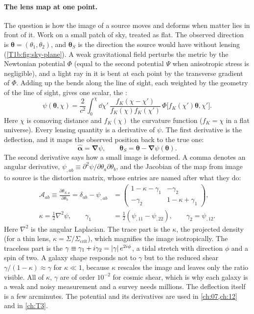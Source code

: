 \paragraph{The lens map at one point.}
The question is how the image of a source moves and deforms when matter lies in front of it. Work on a small patch of sky, treated as flat. The observed direction is $\bm\theta=(\theta_1,\theta_2)$, and $\bm\theta_S$ is the direction the source would have without lensing (\cref{T1b:fig:sky-plane}). A weak gravitational field perturbs the metric by the Newtonian potential $\Phi$ (equal to the second potential $\Psi$ when anisotropic stress is negligible), and a light ray in it is bent at each point by the transverse gradient of $\Phi$. Adding up the bends along the line of sight, each weighted by the geometry of the line of sight, gives one scalar, the :
\begin{equation*}
\psi(\bm\theta,\chi)=\frac{2}{c^2}\int_0^\chi\!\dd\chi'\,\frac{f_K(\chi-\chi')}{f_K(\chi)f_K(\chi')}\,\Phi\bigl[f_K(\chi')\bm\theta,\chi'\bigr].
\end{equation*}
Here $\chi$ is comoving distance and $f_K(\chi)$ the curvature function ($f_K=\chi$ in a flat universe). Every lensing quantity is a derivative of $\psi$. The first derivative is the deflection, and it maps the observed position back to the true one:
\begin{equation*}
\hat{\bm\alpha}=\bm\nabla\psi,\qquad\bm\theta_S=\bm\theta-\bm\nabla\psi(\bm\theta).
\end{equation*}
The second derivative says how a small image is deformed. A comma denotes an angular derivative, $\psi_{,ab}\equiv\partial^2\psi/\partial\theta_a\partial\theta_b$, and the Jacobian of the map from image to source is the distortion matrix, whose entries are named after what they do:
\begin{align*}
\mathcal A_{ab}\equiv\frac{\partial\theta_{S,a}}{\partial\theta_b}=\delta_{ab}-\psi_{,ab}
&=\begin{pmatrix}1-\kappa-\gamma_1&-\gamma_2\\-\gamma_2&1-\kappa+\gamma_1\end{pmatrix},\\
\kappa=\tfrac12\nabla^2\psi,\qquad
\gamma_1&=\tfrac12(\psi_{,11}-\psi_{,22}),\qquad\gamma_2=\psi_{,12}.
\end{align*}
Here $\nabla^2$ is the angular Laplacian. The trace part is the  $\kappa$, the projected density (for a thin lens, $\kappa=\Sigma/\Sigma_{\mathrm{crit}}$), which magnifies the image isotropically. The traceless part is the  $\gamma\equiv\gamma_1+i\gamma_2=\left\lvert \gamma\right\rvert e^{2i\phi}$, a tidal stretch with direction $\phi$ and a spin of two. A galaxy shape responds not to $\gamma$ but to the reduced shear $\gamma/(1-\kappa)\approx\gamma$ for $\kappa\ll1$, because $\kappa$ rescales the image and leaves only the ratio visible. All of $\kappa$, $\gamma$ are of order $10^{-2}$ for cosmic shear, which is why each galaxy is a weak and noisy measurement and a survey needs millions. The deflection itself is a few arcminutes. The potential and its derivatives are used in \cref{ch:07,ch:12} and in \cref{ch:T3}.

